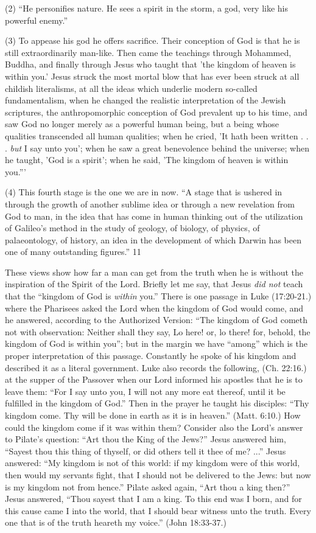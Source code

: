 (2) ``He personifies nature. He sees a spirit in the storm, a god, very like his powerful
enemy.''

(3) To appease his god he offers sacrifice. Their conception of God is that he is still
extraordinarily man-like. Then came the teachings through Mohammed, Buddha, and finally
through Jesus who taught that 'the kingdom of heaven is within you.' Jesus struck the most
mortal blow that has ever been struck at all childish literalisms, at all the ideas which
underlie modern so-called fundamentalism, when he changed the realistic interpretation of
the Jewish scriptures, the anthropomorphic conception of God prevalent up to his time, and
saw God no longer merely as a powerful human being, but a being whose qualities
transcended all human qualities; when he cried, 'It hath been written . . . \textit{but} I say unto you';
when he saw a great benevolence behind the universe; when he taught, 'God is a spirit'; when
he said, 'The kingdom of heaven is within you.'''

(4) This fourth stage is the one we are in now. ``A stage that is ushered in through the growth
of another sublime idea or through a new revelation from God to man, in the idea that has
come in human thinking out of the utilization of Galileo's method in the study of geology, of
biology, of physics, of palaeontology, of history, an idea in the development of which
Darwin has been one of many outstanding figures.'' 11

These views show how far a man can get from the truth when he is without the inspiration of
the Spirit of the Lord. Briefly let me say, that Jesus \textit{did not} teach that the ``kingdom of God is
\textit{within} you.'' There is one passage in Luke (17:20-21.) where the Pharisees asked the Lord
when the kingdom of God would come, and he answered, according to the Authorized
Version: ``The kingdom of God cometh not with observation: Neither shall they say, Lo here!
or, lo there! for, behold, the kingdom of God is within you''; but in the margin we have
``among'' which is the proper interpretation of this passage. Constantly he spoke of his
kingdom and described it as a literal government. Luke also records the following, (Ch.
22:16.) at the supper of the Passover when our Lord informed his apostles that he is to leave
them: ``For I say unto you, I will not any more eat thereof, until it be fulfilled in the kingdom
of God.'' Then in the prayer he taught his disciples: ``Thy kingdom come. Thy will be done in
earth as it is in heaven.'' (Matt. 6:10.) How could the kingdom come if it was within them?
Consider also the Lord's answer to Pilate's question: ``Art thou the King of the Jews?'' Jesus
answered him, ``Sayest thou this thing of thyself, or did others tell it thee of me? ...'' Jesus
answered: ``My kingdom is not of this world: if my kingdom were of this world, then would
my servants fight, that I should not be delivered to the Jews: but now is my kingdom not
from hence.'' Pilate asked again, ``Art thou a king then?'' Jesus answered, ``Thou sayest that I
am a king. To this end was I born, and for this cause came I into the world, that I should bear
witness unto the truth. Every one that is of the truth heareth my voice.'' (John 18:33-37.)

